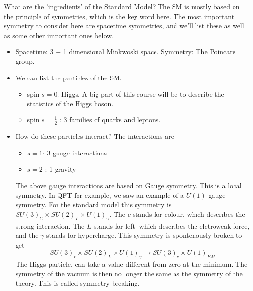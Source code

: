 \documentclass[11pt, oneside]{article}   	%
\theoremstyle{slanted}
\begin{document}
What are the 'ingredients' of the Standard Model? 
The SM is mostly based on the principle of symmetries, which is the key word here. 
The most important symmetry to consider here are spacetime symmetries, 
and we'll list these as well as some other important ones 
below. 
\begin{itemize}
\item  Spacetime: 3 + 1 dimensional Minkwoski space. 
	Symmetry: The Poincare group.
\item We can list the particles of the SM. 
	\begin{itemize}
		\item spin $ s  = 0 $: Higgs. A big part of this 
			course will be to describe the statistics of 
			the Higgs boson. 
		\item spin $ s = \frac{1}{2 } $ : 3 families of quarks and leptons. 
	\end{itemize}
\item How do these particles interact? The interactions are
	\begin{itemize}
		\item $ s = 1 $: 3 gauge interactions
		\item $ s= 2 $  : 1 gravity 
	\end{itemize}
The above gauge interactions are based on Gauge symmetry. 
This is a local symmetry. In QFT for example, we 
saw an example of a $ U ( 1 ) $ gauge symmetry. 
For the standard model this symmetry is $ SU ( 3 )_ C \times 
SU ( 2 ) _{ L } \times U ( 1 ) _{ \gamma }$. 
The $ c $ stands for colour, which describes the 
strong interaction. The $ L $ stands for left, which 
describes the elctroweak force, and the $ \gamma $ stands 
for hypercharge. This symmetry is 
spontenously broken to get 
\[
 SU (  3 ) _  c \times SU ( 2 ) _ L \times U ( 1 ) _{ \gamma  } 
 \to SU ( 3 ) _ c \times U ( 1 ) _{ EM } 
\]  
The Higgs particle, can take 
a value different from zero at the minimum. 
The symmetry of the vacuum is then no longer the 
same as the symmetry of the theory. 
This is called symmetry breaking. 


\end{itemize}
\end{document}
